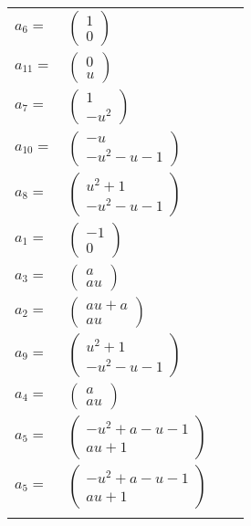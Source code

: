 \documentclass[1p]{elsarticle_modified}
\theoremstyle{definition}
\begin{document}
\begin{tabular}{m{7pt} m{180pt} m{7pt} m{180pt} }
\flushright $a_{6}=$&$\begin{pmatrix}1\\0\end{pmatrix}$ \\
\flushright $a_{11}=$&$\begin{pmatrix}0\\u\end{pmatrix}$ \\
\flushright $a_{7}=$&$\begin{pmatrix}1\\- u^2\end{pmatrix}$ \\
\flushright $a_{10}=$&$\begin{pmatrix}- u\\- u^2- u-1\end{pmatrix}$ \\
\flushright $a_{8}=$&$\begin{pmatrix}u^2+1\\- u^2- u-1\end{pmatrix}$ \\
\flushright $a_{1}=$&$\begin{pmatrix}-1\\0\end{pmatrix}$ \\
\flushright $a_{3}=$&$\begin{pmatrix}a\\a u\end{pmatrix}$ \\
\flushright $a_{2}=$&$\begin{pmatrix}a u+a\\a u\end{pmatrix}$ \\
\flushright $a_{9}=$&$\begin{pmatrix}u^2+1\\- u^2- u-1\end{pmatrix}$ \\
\flushright $a_{4}=$&$\begin{pmatrix}a\\a u\end{pmatrix}$ \\
\flushright $a_{5}=$&$\begin{pmatrix}- u^2+a- u-1\\a u+1\end{pmatrix}$\\ \flushright $a_{5}=$&$\begin{pmatrix}- u^2+a- u-1\\a u+1\end{pmatrix}$\\&\end{tabular}
\end{document}
